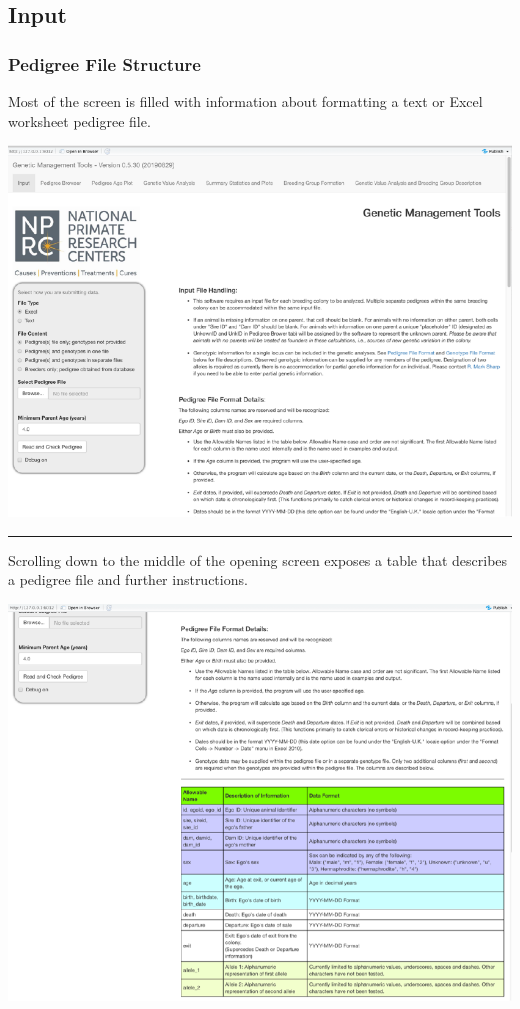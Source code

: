\documentclass[
]{article}
\begin{document}
\hypertarget{input}{%
\subsection{Input}\label{input}}

\hypertarget{pedigree-file-structure}{%
\subsubsection{Pedigree File Structure}\label{pedigree-file-structure}}

Most of the screen is filled with information about formatting a text or
Excel worksheet pedigree file.

\includegraphics{shiny_app_use_files/figure-latex/eopening-screen-top-1.pdf}

\begin{center}\rule{0.5\linewidth}{\linethickness}\end{center}

Scrolling down to the middle of the opening screen exposes a table that
describes a pedigree file and further instructions.

\includegraphics{shiny_app_use_files/figure-latex/eopening-screen-middle-1.pdf}
\end{document}
